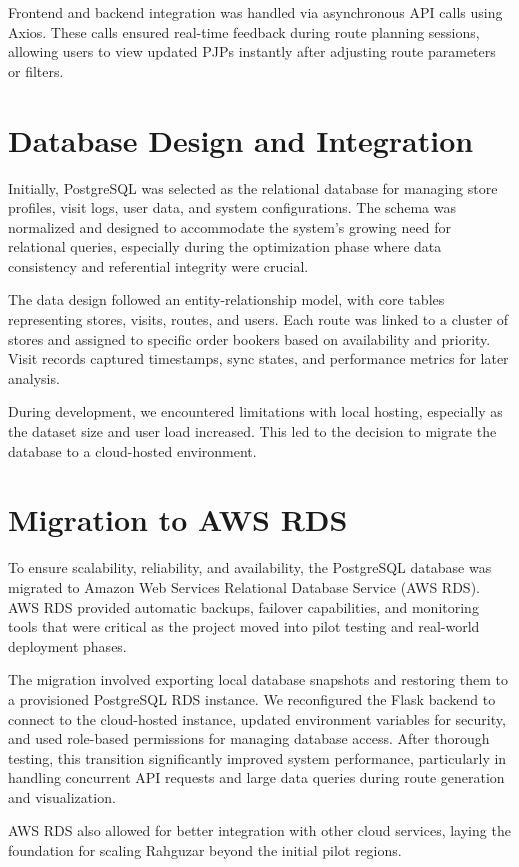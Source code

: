 Frontend and backend integration was handled via asynchronous API calls using Axios. These calls ensured real-time feedback during route planning sessions, allowing users to view updated PJPs instantly after adjusting route parameters or filters.

\section{Database Design and Integration}
Initially, PostgreSQL was selected as the relational database for managing store profiles, visit logs, user data, and system configurations. The schema was normalized and designed to accommodate the system's growing need for relational queries, especially during the optimization phase where data consistency and referential integrity were crucial.

The data design followed an entity-relationship model, with core tables representing stores, visits, routes, and users. Each route was linked to a cluster of stores and assigned to specific order bookers based on availability and priority. Visit records captured timestamps, sync states, and performance metrics for later analysis.

During development, we encountered limitations with local hosting, especially as the dataset size and user load increased. This led to the decision to migrate the database to a cloud-hosted environment.

\section{Migration to AWS RDS}
To ensure scalability, reliability, and availability, the PostgreSQL database was migrated to Amazon Web Services Relational Database Service (AWS RDS). AWS RDS provided automatic backups, failover capabilities, and monitoring tools that were critical as the project moved into pilot testing and real-world deployment phases.

The migration involved exporting local database snapshots and restoring them to a provisioned PostgreSQL RDS instance. We reconfigured the Flask backend to connect to the cloud-hosted instance, updated environment variables for security, and used role-based permissions for managing database access. After thorough testing, this transition significantly improved system performance, particularly in handling concurrent API requests and large data queries during route generation and visualization.

AWS RDS also allowed for better integration with other cloud services, laying the foundation for scaling Rahguzar beyond the initial pilot regions.

